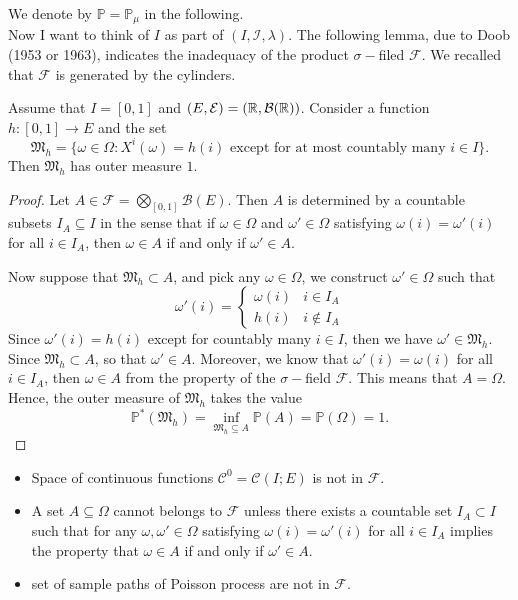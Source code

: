 We denote by $\mathbb{P}= \mathbb{P}_\mu$ in the following.\\

 
Now I want to think of $I$ as part of $(I,\mathcal{I}, \lambda)$. The following lemma, due to Doob (1953 or 1963), indicates the inadequacy of the product $\sigma-$filed $\mathcal{F}$. We recalled that $\mathcal{F}$ is generated by the cylinders.

\begin{lemma}
	Assume that $I=[0,1]$ and $(E,\mathcal{E}) = (\mathbb{R}, {\cal B}(\mathbb{R}))$. Consider a function $h: [0,1] \to E$ and the set 
	$$
		\mathfrak{M}_h = \{ \omega \in \Omega:  X^{i}(\omega)= h(i) \text{ except for at most countably many }  i\in I \}.
	$$
	Then $\mathfrak{M}_h$ has outer measure $1$.
\end{lemma}

\begin{proof}
	Let $A \in \mathcal{F} = \bigotimes_{[0,1]} \mathcal{B}(E)$. Then $A$ is determined by a countable subsets $I_A \subseteq I$ in the sense that if $\omega \in \Omega$ and $\omega' \in \Omega$ satisfying $\omega(i) = \omega'(i)$ for all $i \in I_A$, then $\omega \in A$ if and only if $\omega' \in A$.
	
	Now suppose that $\mathfrak{M}_h \subset A$, and pick any $\omega \in \Omega$, we construct $\omega' \in \Omega$ such that
	$$
	\omega'(i) = 
	\left\{
		\begin{array}{cc}
			\omega(i) & i \in I_A \\
			h(i) & i \notin I_A
		\end{array}
	\right.
	$$
	Since $\omega'(i) = h(i)$ except for countably many $i \in I$, then we have $\omega' \in \mathfrak{M}_h$. Since $\mathfrak{M}_h \subset A$, so that $\omega' \in A$. Moreover, we know that $\omega'(i) = \omega(i)$ for all $i \in I_A$, then $\omega \in A$ from the property of the $\sigma-$field $\mathcal{F}$. This means that $A = \Omega$. Hence, the outer measure of $\mathfrak{M}_h$ takes the value
	$$
		\mathbb{P}^*(\mathfrak{M}_h) = \inf_{\mathfrak{M}_h \subseteq A} \mathbb{P}(A) = \mathbb{P}(\Omega) = 1.
	$$
\end{proof}

\begin{remark}
	\begin{itemize}
		\item Space of continuous functions $\mathcal{C}^0 = \mathcal{C}(I;E)$ is not in $\mathcal{F}$.
		\item A set $A \subseteq \Omega$ cannot belongs to $\mathcal{F}$ unless there exists a countable set $I_A \subset I$ such that for any $\omega, \omega' \in \Omega$ satisfying $\omega(i) = \omega'(i)$ for all $i \in I_A$ implies the property that $\omega \in A$ if and only if $\omega' \in A$.
		\item set of sample paths of Poisson process are not in $\mathcal{F}$.
	\end{itemize}
\end{remark}


